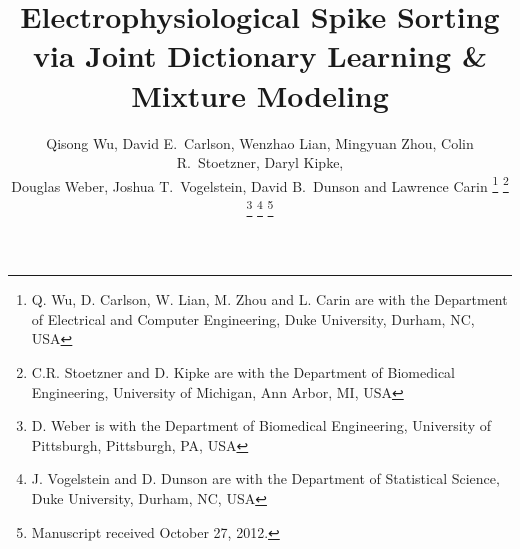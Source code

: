 \documentclass[journal]{IEEEtran}
\begin{document}
%
\title{
{Electrophysiological Spike Sorting via Joint Dictionary Learning \& Mixture Modeling}
}%
%
%

\author{Qisong Wu, David E.~Carlson, Wenzhao Lian, Mingyuan Zhou, Colin R.~Stoetzner, Daryl Kipke, \\ Douglas Weber, Joshua T.~Vogelstein, David B.~Dunson and Lawrence Carin%
\thanks{Q. Wu, D. Carlson, W. Lian, M. Zhou and L. Carin are with the Department
of Electrical and Computer Engineering, Duke University, Durham, NC, USA}%
\thanks{C.R. Stoetzner and D. Kipke are with the Department of Biomedical Engineering, University of Michigan, Ann Arbor, MI, USA}%
\thanks{D. Weber is with the Department of Biomedical Engineering, University of Pittsburgh, Pittsburgh, PA, USA}%
\thanks{J. Vogelstein and D. Dunson are with the Department of Statistical Science, Duke University, Durham, NC, USA}
\thanks{Manuscript received October 27, 2012.}}

%
%
\end{document}
